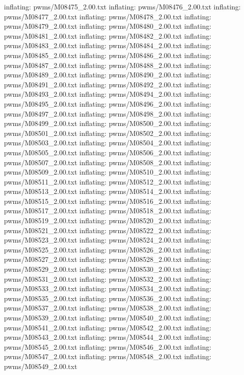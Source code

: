 \documentclass[letterpaper,10pt,english]{sphinxmanual}
\begin{document}
{\begin{sphinxVerbatim}[commandchars=\\\{\}]
  inflating: pwms/M08475\_2.00.txt
  inflating: pwms/M08476\_2.00.txt
  inflating: pwms/M08477\_2.00.txt
  inflating: pwms/M08478\_2.00.txt
  inflating: pwms/M08479\_2.00.txt
  inflating: pwms/M08480\_2.00.txt
  inflating: pwms/M08481\_2.00.txt
  inflating: pwms/M08482\_2.00.txt
  inflating: pwms/M08483\_2.00.txt
  inflating: pwms/M08484\_2.00.txt
  inflating: pwms/M08485\_2.00.txt
  inflating: pwms/M08486\_2.00.txt
  inflating: pwms/M08487\_2.00.txt
  inflating: pwms/M08488\_2.00.txt
  inflating: pwms/M08489\_2.00.txt
  inflating: pwms/M08490\_2.00.txt
  inflating: pwms/M08491\_2.00.txt
  inflating: pwms/M08492\_2.00.txt
  inflating: pwms/M08493\_2.00.txt
  inflating: pwms/M08494\_2.00.txt
  inflating: pwms/M08495\_2.00.txt
  inflating: pwms/M08496\_2.00.txt
  inflating: pwms/M08497\_2.00.txt
  inflating: pwms/M08498\_2.00.txt
  inflating: pwms/M08499\_2.00.txt
  inflating: pwms/M08500\_2.00.txt
  inflating: pwms/M08501\_2.00.txt
  inflating: pwms/M08502\_2.00.txt
  inflating: pwms/M08503\_2.00.txt
  inflating: pwms/M08504\_2.00.txt
  inflating: pwms/M08505\_2.00.txt
  inflating: pwms/M08506\_2.00.txt
  inflating: pwms/M08507\_2.00.txt
  inflating: pwms/M08508\_2.00.txt
  inflating: pwms/M08509\_2.00.txt
  inflating: pwms/M08510\_2.00.txt
  inflating: pwms/M08511\_2.00.txt
  inflating: pwms/M08512\_2.00.txt
  inflating: pwms/M08513\_2.00.txt
  inflating: pwms/M08514\_2.00.txt
  inflating: pwms/M08515\_2.00.txt
  inflating: pwms/M08516\_2.00.txt
  inflating: pwms/M08517\_2.00.txt
  inflating: pwms/M08518\_2.00.txt
  inflating: pwms/M08519\_2.00.txt
  inflating: pwms/M08520\_2.00.txt
  inflating: pwms/M08521\_2.00.txt
  inflating: pwms/M08522\_2.00.txt
  inflating: pwms/M08523\_2.00.txt
  inflating: pwms/M08524\_2.00.txt
  inflating: pwms/M08525\_2.00.txt
  inflating: pwms/M08526\_2.00.txt
  inflating: pwms/M08527\_2.00.txt
  inflating: pwms/M08528\_2.00.txt
  inflating: pwms/M08529\_2.00.txt
  inflating: pwms/M08530\_2.00.txt
  inflating: pwms/M08531\_2.00.txt
  inflating: pwms/M08532\_2.00.txt
  inflating: pwms/M08533\_2.00.txt
  inflating: pwms/M08534\_2.00.txt
  inflating: pwms/M08535\_2.00.txt
  inflating: pwms/M08536\_2.00.txt
  inflating: pwms/M08537\_2.00.txt
  inflating: pwms/M08538\_2.00.txt
  inflating: pwms/M08539\_2.00.txt
  inflating: pwms/M08540\_2.00.txt
  inflating: pwms/M08541\_2.00.txt
  inflating: pwms/M08542\_2.00.txt
  inflating: pwms/M08543\_2.00.txt
  inflating: pwms/M08544\_2.00.txt
  inflating: pwms/M08545\_2.00.txt
  inflating: pwms/M08546\_2.00.txt
  inflating: pwms/M08547\_2.00.txt
  inflating: pwms/M08548\_2.00.txt
  inflating: pwms/M08549\_2.00.txt

\end{sphinxVerbatim}}
\end{document}
